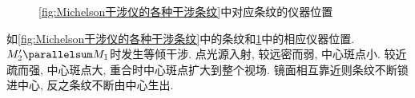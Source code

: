\documentclass{ctexart}
\begin{document}
\begin{figure}[ht]
    \centering
    \begin{subfigure}{2cm}
        \centering
        \caption{}
    \end{subfigure}
    \begin{subfigure}{2cm}
        \centering
        \caption{}
    \end{subfigure}
    \begin{subfigure}{2cm}
        \centering
        \caption{}
    \end{subfigure}
    \begin{subfigure}{2cm}
        \centering
        \caption{}
    \end{subfigure}
    \begin{subfigure}{2cm}
        \centering
        \caption{}
    \end{subfigure}
        \begin{subfigure}{2cm}
        \centering
        \caption{}
    \end{subfigure}
    \begin{subfigure}{2cm}
        \centering
        \caption{}
    \end{subfigure}
    \begin{subfigure}{2cm}
        \centering
        \caption{}
    \end{subfigure}
    \begin{subfigure}{2cm}
        \centering
        \caption{}
    \end{subfigure}
    \begin{subfigure}{2cm}
        \centering
        \caption{}
    \end{subfigure}
    \caption{\cref{fig:Michelson干涉仪的各种干涉条纹}中对应条纹的仪器位置}
    \label{fig:对应条纹的仪器位置}
\end{figure}
如\cref{fig:Michelson干涉仪的各种干涉条纹}中的条纹和\cref{fig:对应条纹的仪器位置}中的相应仪器位置. $M_2'\parallelsum M_1$时发生等倾干涉. 点光源入射, 较远密而弱, 中心斑点小. 较近疏而强, 中心斑点大, 重合时中心斑点扩大到整个视场. 镜面相互靠近则条纹不断锁进中心, 反之条纹不断由中心生出.
\par
\end{document}
